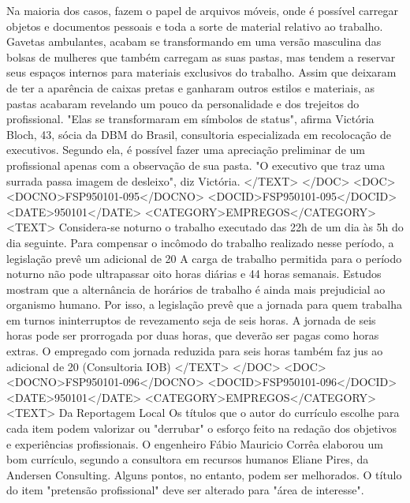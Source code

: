 Na maioria dos casos, fazem o papel de arquivos móveis, onde é possível carregar objetos e documentos pessoais e toda a sorte de material relativo ao trabalho.
Gavetas ambulantes, acabam se transformando em uma versão masculina das bolsas de mulheres que também carregam as suas pastas, mas tendem a reservar seus espaços internos para materiais exclusivos do trabalho.
Assim que deixaram de ter a aparência de caixas pretas e ganharam outros estilos e materiais, as pastas acabaram revelando um pouco da personalidade e dos trejeitos do profissional.
"Elas se transformaram em símbolos de status", afirma Victória Bloch, 43, sócia da DBM do Brasil, consultoria especializada em recolocação de executivos.
Segundo ela, é possível fazer uma apreciação preliminar de um profissional apenas com a observação de sua pasta. "O executivo que traz uma surrada passa imagem de desleixo", diz Victória.
</TEXT>
</DOC>
<DOC>
<DOCNO>FSP950101-095</DOCNO>
<DOCID>FSP950101-095</DOCID>
<DATE>950101</DATE>
<CATEGORY>EMPREGOS</CATEGORY>
<TEXT>
Considera-se noturno o trabalho executado das 22h de um dia às 5h do dia seguinte. Para compensar o incômodo do trabalho realizado nesse período, a legislação prevê um adicional de 20%
A carga de trabalho permitida para o período noturno não pode ultrapassar oito horas diárias e 44 horas semanais.
Estudos mostram que a alternância de horários de trabalho é ainda mais prejudicial ao organismo humano. Por isso, a legislação prevê que a jornada para quem trabalha em turnos ininterruptos de revezamento seja de seis horas.
A jornada de seis horas pode ser prorrogada por duas horas, que deverão ser pagas como horas extras.
O empregado com jornada reduzida para seis horas também faz jus ao adicional de 20%
(Consultoria IOB)
</TEXT>
</DOC>
<DOC>
<DOCNO>FSP950101-096</DOCNO>
<DOCID>FSP950101-096</DOCID>
<DATE>950101</DATE>
<CATEGORY>EMPREGOS</CATEGORY>
<TEXT>
Da Reportagem Local 
Os títulos que o autor do currículo escolhe para cada item podem valorizar ou "derrubar" o esforço feito na redação dos objetivos e experiências profissionais.
O engenheiro Fábio Mauricio Corrêa elaborou um bom currículo, segundo a consultora em recursos humanos Eliane Pires, da Andersen Consulting. Alguns pontos, no entanto, podem ser melhorados.
O título do item "pretensão profissional" deve ser alterado para "área de interesse".
